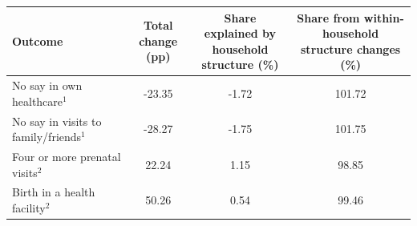\begin{tabular}{lccc}
\toprule
Outcome & \makecell{Total change\\(pp)} & \makecell{Share explained by \\household structure (\%)} & \makecell{Share from within-\\household structure changes (\%)} \\
\midrule
No say in own healthcare$^1$&-23.35&-1.72&101.72\\
No say in visits to family/friends$^1$&-28.27&-1.75&101.75\\
Four or more prenatal visits$^2$&22.24&1.15&98.85\\
Birth in a health facility$^2$&50.26&0.54&99.46\\
\bottomrule
\end{tabular}
